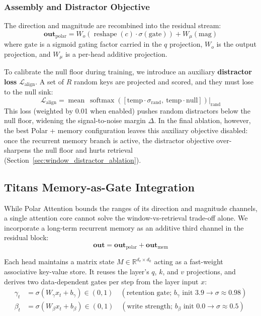 \documentclass{article} %
\begin{document}
\subsubsection{Assembly and Distractor Objective}
The direction and magnitude are recombined into the residual stream:
\begin{equation}
    \mathbf{out}_{\text{polar}} = W_o\left( \operatorname{reshape}(c) \cdot \sigma(\text{gate}) \right) + W_{\mu}(\mathrm{mag})
\end{equation}
where $\text{gate}$ is a sigmoid gating factor carried in the $q$ projection, $W_o$ is the output projection, and $W_{\mu}$ is a per-head additive projection.

To calibrate the null floor during training, we introduce an auxiliary \textbf{distractor loss} $\mathcal{L}_{\text{align}}$. A set of $R$ random keys are projected and scored, and they must lose to the null sink:
\begin{equation}
    \mathcal{L}_{\text{align}} = \operatorname{mean}\ \operatorname{softmax}\left( [ \mathrm{temp} \cdot \sigma_{\text{rand}}, \ \mathrm{temp} \cdot \mathrm{null} ] \right)\Big|_{\text{rand}}
\end{equation}
This loss (weighted by 0.01 when enabled) pushes random distractors below the null floor, widening the signal-to-noise margin $\Delta$. In the final ablation, however, the best Polar + memory configuration leaves this auxiliary objective disabled: once the recurrent memory branch is active, the distractor objective over-sharpens the null floor and hurts retrieval (Section~\ref{sec:window_distractor_ablation}).

\subsection{Titans Memory-as-Gate Integration}
While Polar Attention bounds the ranges of its direction and magnitude channels, a single attention core cannot solve the window-vs-retrieval trade-off alone. We incorporate a long-term recurrent memory as an additive third channel in the residual block:
\begin{equation}
    \mathbf{out} = \mathbf{out}_{\text{polar}} + \mathbf{out}_{\text{mem}}
\end{equation}

Each head maintains a matrix state $M \in \mathbb{R}^{d_v \times d_k}$ acting as a fast-weight associative key-value store. It reuses the layer's $q$, $k$, and $v$ projections, and derives two data-dependent gates per step from the layer input $x$:
\begin{align}
    \gamma_t &= \sigma(W_{\gamma} x_t + b_{\gamma}) \in (0, 1) \quad (\text{retention gate; } b_{\gamma} \text{ init } 3.9 \to \sigma \approx 0.98) \\
    \beta_t &= \sigma(W_{\beta} x_t + b_{\beta}) \in (0, 1) \quad (\text{write strength; } b_{\beta} \text{ init } 0.0 \to \sigma \approx 0.5)
\end{align}
\end{document}
